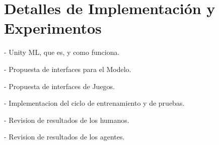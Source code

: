 \chapter{Detalles de Implementación y Experimentos}\label{chapter:implementation}

- Unity ML, que es, y como funciona.

- Propuesta de interfaces para el Modelo.

- Propuesta de interfaces de Juegos.

- Implementacion del ciclo de entrenamiento y de pruebas.

- Revision de resultados de los humanos.

- Revision de resultados de los agentes.